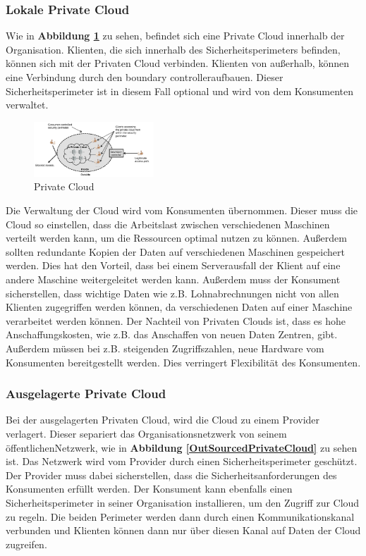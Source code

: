 \subsubsection{Lokale Private Cloud}

Wie in \textbf{Abbildung \ref{PrivateCloud}} zu sehen, befindet sich eine Private Cloud innerhalb der Organisation.
Klienten, die sich innerhalb des Sicherheitsperimeters befinden, können sich mit der Privaten Cloud verbinden. 
Klienten von außerhalb, können eine Verbindung durch den \glqq boundary controller\grqq aufbauen. Dieser Sicherheitsperimeter ist in diesem
Fall optional und wird von dem Konsumenten verwaltet.

\begin{figure}[H]
    \centering
	\includegraphics[width=0.4\textwidth]{Images/On-sitePrivateCloud}
	\caption{Private Cloud \cite{Badger}}
	\label{PrivateCloud}
\end{figure}

Die Verwaltung der Cloud wird vom Konsumenten übernommen. Dieser muss die Cloud so einstellen, dass die Arbeitslast zwischen verschiedenen
Maschinen verteilt werden kann, um die Ressourcen optimal nutzen zu können. Außerdem sollten redundante Kopien der Daten auf verschiedenen Maschinen 
gespeichert werden. Dies hat den Vorteil, dass bei einem Serverausfall der Klient auf eine andere Maschine weitergeleitet werden kann.
Außerdem muss der Konsument sicherstellen, dass wichtige Daten wie z.B. Lohnabrechnungen nicht von allen Klienten zugegriffen werden können,
da verschiedenen Daten auf einer Maschine verarbeitet werden können. Der Nachteil von Privaten Clouds ist, dass es hohe Anschaffungskosten, wie z.B. 
das Anschaffen von neuen Daten Zentren, gibt. Außerdem müssen bei z.B. steigenden Zugriffszahlen, neue Hardware vom Konsumenten bereitgestellt werden. 
Dies verringert Flexibilität des Konsumenten.

\subsubsection{Ausgelagerte Private Cloud}

Bei der ausgelagerten Privaten Cloud, wird die Cloud zu einem Provider verlagert. Dieser separiert das Organisationsnetzwerk
von seinem \glqq öffentlichen\grqq Netzwerk, wie in \textbf{Abbildung \ref{OutSourcedPrivateCloud}} zu sehen ist. Das Netzwerk wird vom Provider
durch einen Sicherheitsperimeter geschützt. Der Provider muss dabei sicherstellen, dass die Sicherheitsanforderungen des Konsumenten erfüllt werden. 
Der Konsument kann ebenfalls einen Sicherheitsperimeter in seiner Organisation installieren, um den Zugriff zur Cloud zu regeln.
Die beiden Perimeter werden dann durch einen Kommunikationskanal verbunden und Klienten können dann nur über diesen Kanal auf Daten der Cloud zugreifen.

